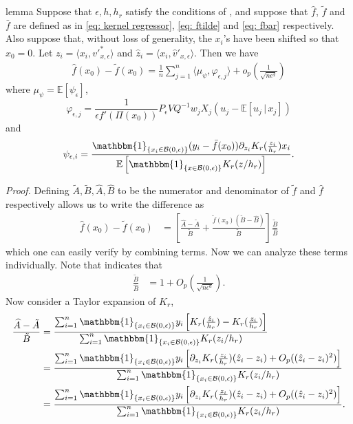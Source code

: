 \documentclass[11pt]{article}
\begin{document}
\begin{restatable}{lemma}{}\label{lemma: fhat minus ftilde}
    Suppose that $\epsilon, h, h_r$ satisfy the conditions of , and suppose that $\hat{f}$, $\tilde{f}$ and $\bar{f}$ are defined as in \cref{eq: kernel regressor}, \cref{eq: ftilde} and \cref{eq: fbar} respectively. Also suppose that, without loss of generality, the $x_i$'s have been shifted so that $x_0 = 0$. Let $z_i = \langle x_i, v'^*_{x, \epsilon}\rangle$ and $\hat{z}_i = \langle x_i, \hat{v}'_{x, \epsilon}\rangle$. Then we have
    \begin{align}
        \hat{f}(x_0) - \tilde{f}(x_0) = \frac{1}{n}\sum_{j = 1}^n\langle\mu_{\psi}, \varphi_{\epsilon, j}\rangle + o_p\left(\frac{1}{\sqrt{n\epsilon^d}}\right)
    \end{align}
    where $\mu_{\psi} = \mathbb{E}[\psi_{\epsilon}]$,  
    \[\varphi_{\epsilon, j} = \frac{1}{\epsilon f'(\Pi(x_0))}P_{\epsilon}VQ^{-1}w_jX_j(u_j - \mathbb{E}[u_j \,|\, x_j])\]
    and
    \[\psi_{\epsilon, i} = \frac{\mathbbm{1}_{\{x_i \in \mathcal{B}(0, \epsilon)\}}(y_i - \bar{f}(x_0))\partial_{z_i}K_r(\frac{z_i}{h_r})x_i}{\mathbb{E}\left[\mathbbm{1}_{\{x \in \mathcal{B}(0, \epsilon)\}}K_r(z/h_r)\right]}.\]
\end{restatable}
\noindent \textit{Proof.} 
Defining $\tilde{A}, \tilde{B}, \widehat{A}, \widehat{B}$ to be the numerator and denominator of $\tilde{f}$ and $\hat{f}$ respectively allows us to write the difference as
\begin{align}
    \hat{f}(x_0) - \tilde{f}(x_0)  &= \left[\frac{\widehat{A}-\tilde{A}}{\tilde{B}} + \frac{\tilde f(x_0)\left(\tilde{B} - \widehat{B}\right)}{\tilde{B}}\right]\frac{\tilde{B}}{\widehat{B}} \label{eq: kdr estimator decomp}
\end{align}
which one can easily verify by combining terms. Now we can analyze these terms individually. Note that  indicates that
\begin{align*}
    \frac{\tilde{B}}{\widehat{B}} &= 1  + O_p\left(\frac{1}{\sqrt{n\epsilon^d}}\right).
\end{align*}
Now consider a Taylor expansion of $K_r$,
\begin{align*}
    \frac{\widehat{A} - \tilde{A}}{\tilde{B}} &= \frac{\sum_{i=1}^n\mathbbm{1}_{\{x_i \in \mathcal{B}(0, \epsilon)\}}y_i\left[K_r(\frac{\hat{z}_i}{h_r}) - K_r(\frac{z_i}{h_r})\right]}{\sum_{i = 1}^n\mathbbm{1}_{\{x_i \in \mathcal{B}(0, \epsilon)\}}K_r(z_i/h_r)} \\
    &= \frac{\sum_{i=1}^n\mathbbm{1}_{\{x_i \in \mathcal{B}(0, \epsilon)\}}y_i\left[\partial_{z_i}K_r(\frac{z_i}{h_r})(\hat{z}_i - z_i) + O_p((\hat{z}_i - z_i)^2)\right]}{\sum_{i = 1}^n\mathbbm{1}_{\{x_i \in \mathcal{B}(0, \epsilon)\}}K_r(z_i/h_r)} \\
    &= \frac{\sum_{i=1}^n\mathbbm{1}_{\{x_i \in \mathcal{B}(0, \epsilon)\}}y_i\left[\partial_{z_i}K_r(\frac{z_i}{h_r})(\hat{z}_i - z_i) + O_p((\hat{z}_i - z_i)^2)\right]}{\sum_{i = 1}^n\mathbbm{1}_{\{x_i \in \mathcal{B}(0, \epsilon)\}}K_r(z_i/h_r)}.
\end{align*}
\end{document}
